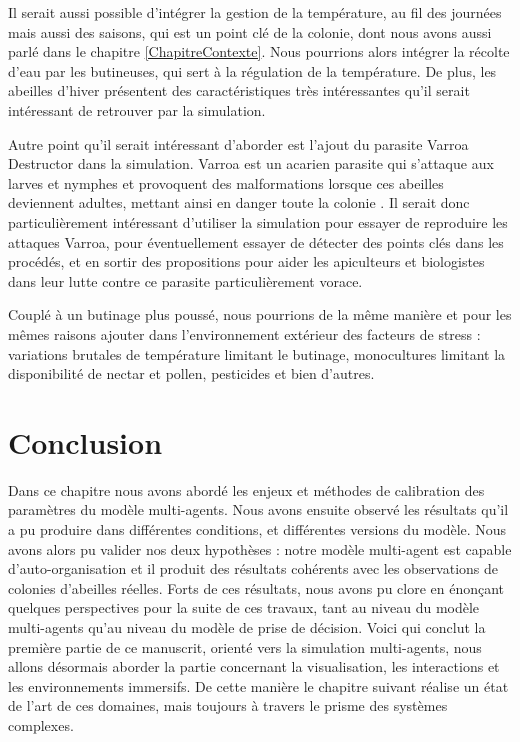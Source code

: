 	Il serait aussi possible d'intégrer la gestion de la température, au fil des journées mais aussi des saisons, qui est un point clé de la colonie, dont nous avons aussi parlé dans le chapitre \ref{ChapitreContexte}. Nous pourrions alors intégrer la récolte d'eau par les butineuses, qui sert à la régulation de la température. De plus, les abeilles d'hiver présentent des caractéristiques très intéressantes qu'il serait intéressant de retrouver par la simulation. 
	
	Autre point qu'il serait intéressant d'aborder est l'ajout du parasite Varroa Destructor dans la simulation. Varroa est un acarien parasite qui s'attaque aux larves et nymphes et provoquent des malformations lorsque ces abeilles deviennent adultes, mettant ainsi en danger toute la colonie \cite{le_conte_varroa_2010}. Il serait donc particulièrement intéressant d'utiliser la simulation pour essayer de reproduire les attaques Varroa, pour éventuellement essayer de détecter des points clés dans les procédés, et en sortir des propositions pour aider les apiculteurs et biologistes dans leur lutte contre ce parasite particulièrement vorace.
	
	Couplé à un butinage plus poussé, nous pourrions de la même manière et pour les mêmes raisons ajouter dans l'environnement extérieur des facteurs de stress : variations brutales de température limitant le butinage, monocultures limitant la disponibilité de nectar et pollen, pesticides et bien d'autres.
	
	
			
	\section*{Conclusion}
	Dans ce chapitre nous avons abordé les enjeux et méthodes de calibration des paramètres du modèle multi-agents. Nous avons ensuite observé les résultats qu'il a pu produire dans différentes conditions, et différentes versions du modèle. Nous avons alors pu valider nos deux hypothèses : notre modèle multi-agent est capable d'auto-organisation et il produit des résultats cohérents avec les observations de colonies d'abeilles réelles. Forts de ces résultats, nous avons pu clore en énonçant quelques perspectives pour la suite de ces travaux, tant au niveau du modèle multi-agents qu'au niveau du modèle de prise de décision. Voici qui conclut la première partie de ce manuscrit, orienté vers la simulation multi-agents, nous allons désormais aborder la partie concernant la visualisation, les interactions et les environnements immersifs. De cette manière le chapitre suivant réalise un état de l'art de ces domaines, mais toujours à travers le prisme des systèmes complexes.